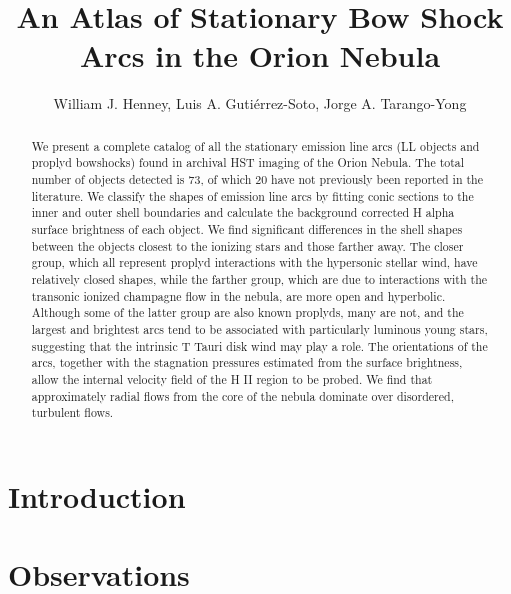 \documentclass{emulateapj}
\begin{document}
\title{
  An Atlas of Stationary Bow Shock Arcs in the Orion Nebula
}
\author{
  William J. Henney, 
  Luis A. Gutiérrez-Soto,
  Jorge A. Tarango-Yong 
}


\begin{abstract}
  We present a complete catalog of all the stationary emission line arcs (LL objects and proplyd bowshocks) found in archival HST imaging of the Orion Nebula.   The total number of objects detected is 73, of which 20 have not previously been reported in the literature.  We classify the shapes of emission line arcs by fitting conic sections to the inner and outer shell boundaries and calculate the background corrected H alpha surface brightness of each object.   We find significant differences in the shell shapes between the objects closest to the ionizing stars and those farther away.  The closer group, which all represent proplyd interactions with the hypersonic stellar wind, have relatively closed shapes, while the farther group, which are due to interactions with the transonic ionized champagne flow in the nebula, are more open and hyperbolic.  Although some of the latter group are also known proplyds, many are not, and the largest and brightest arcs tend to be associated with particularly luminous young stars, suggesting that the intrinsic T Tauri disk wind may play a role.  The orientations of the arcs, together with the stagnation pressures estimated from the surface brightness, allow the internal velocity field of the H II region to be probed.  We find that approximately radial flows from the core of the nebula dominate over disordered, turbulent flows.
\end{abstract}

\section{Introduction}
\label{sec:intro}

\section{Observations}
\label{sec:discuss}
\end{document}
